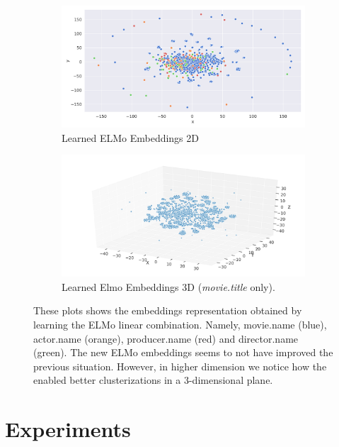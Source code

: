 \documentclass[11pt,a4paper]{article}
\begin{document}
\begin{figure}[!ht]
\begin{subfigure}{0.5\linewidth}
  \centering
  \includegraphics[width=\linewidth]{img/elmo-embeddings-learned.png}
  \caption{Learned ELMo Embeddings 2D}
  \label{fig:sfig1}
\end{subfigure}%
\begin{subfigure}{0.5\linewidth}
  \centering
  \includegraphics[width=\linewidth]{img/elmo-embeddings-learned-clusters.png}
  \caption{Learned Elmo Embeddings 3D (\textit{movie.title} only).}
  \label{fig:sfig2}
\end{subfigure}
\caption{These plots shows the embeddings representation obtained by learning the ELMo linear combination. Namely, movie.name (blue), actor.name (orange), producer.name (red) and director.name (green). The new ELMo embeddings seems to not have improved the previous situation. However, in higher dimension we notice how the enabled better clusterizations in a 3-dimensional plane.}
\label{fig:fig}
\end{figure}

\section{Experiments}
\end{document}
